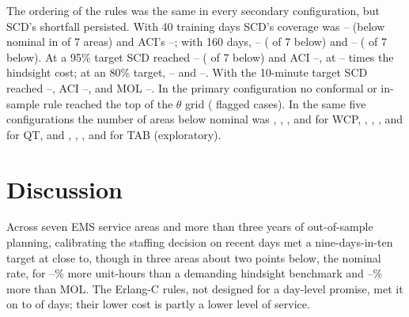 \documentclass[11pt]{article}
\begin{document}
The ordering of the rules was the same in every secondary configuration, but SCD's shortfall persisted. With 40 training days SCD's coverage was -- (below nominal in  of 7 areas) and ACI's --; with 160 days, -- ( of 7 below) and -- ( of 7 below). At a 95\% target SCD reached -- ( of 7 below) and ACI --, at -- times the hindsight cost; at an 80\% target, -- and --. With the 10-minute target SCD reached --, ACI --, and MOL --. In the primary configuration no conformal or in-sample rule reached the top of the $\theta$ grid ( flagged cases). In the same five configurations the number of areas below nominal was , , ,  and  for WCP, , , ,  and  for QT, and , , ,  and  for TAB (exploratory).

\section{Discussion}

Across seven EMS service areas and more than three years of out-of-sample planning, calibrating the staffing decision on recent days met a nine-days-in-ten target at close to, though in three areas about two points below, the nominal rate, for --\% more unit-hours than a demanding hindsight benchmark and --\% more than MOL. The Erlang-C rules, not designed for a day-level promise, met it on  to  of days; their lower cost is partly a lower level of service.
\end{document}
